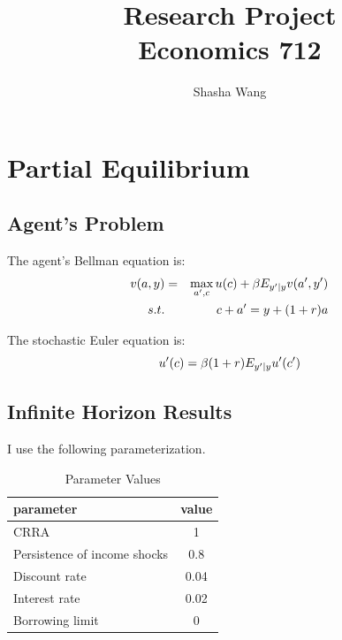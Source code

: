 \documentclass[thmsa,10pt]{article}
\begin{document}

\author{Shasha Wang}

\title{Research Project \\Economics 712}
\maketitle

\section{Partial Equilibrium}

\subsection{Agent's Problem}
The agent's Bellman equation is:
\begin{eqnarray}
v(a,y) &=& \max_{a^\prime,c} u(c)+\beta E_{y^\prime|y} v(a^\prime,y^\prime) \notag\\
s.t. && c+a^\prime = y+(1+r)a \notag
\end{eqnarray}

The stochastic Euler equation is:
\begin{equation}
u^\prime(c) = \beta (1+r)E_{y^\prime|y}  u^\prime(c^\prime) \notag
\end{equation}

\subsection{Infinite Horizon Results}

I use the following parameterization.
\begin{table}
\caption{Parameter Values}
\begin{center}
\begin{tabular}{l|c}
  \hline
  parameter &value\\
\hline
  CRRA &  1 \\
  Persistence of income shocks &  0.8 \\
  Discount rate & 0.04 \\
  Interest rate & 0.02 \\
  Borrowing limit & 0 \\
  \hline
\end{tabular}
\end{center}
\label{tab:param}
\end{table}
\end{document}
